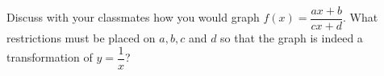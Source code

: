 {Discuss with your classmates how you would graph $f(x) = \dfrac{ax + b}{cx + d}$.  What restrictions must be placed on $a, b, c$ and $d$ so that the graph is indeed a transformation of $y = \dfrac{1}{x}$?}
{}